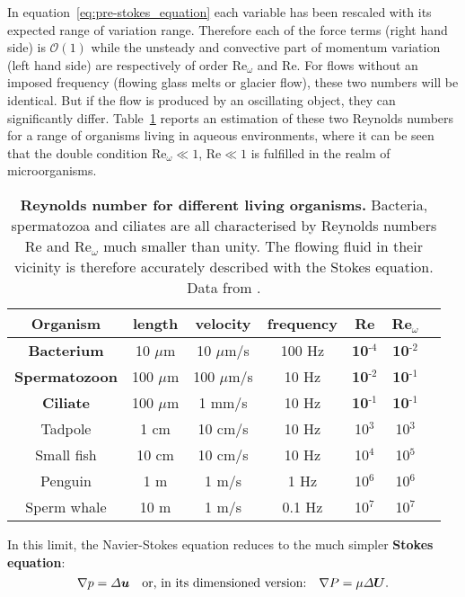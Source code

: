In equation~\eqref{eq:pre-stokes_equation} each variable has been rescaled with its expected range of variation range. Therefore each of the force terms (right hand side) is $\mathcal O(1)$ while the unsteady and convective part of momentum variation (left hand side) are respectively of order $\mathrm{Re}_\omega$ and $\mathrm{Re}$. For flows without an imposed frequency (flowing glass melts or glacier flow), these two numbers will be identical. But if the flow is produced by an oscillating object, they can significantly differ. Table~\ref{tbl:Reynolds} reports an estimation of these two Reynolds numbers for a range of organisms living in aqueous environments, where it can be seen that the double condition $\mathrm{Re}_\omega\ll 1$, $\mathrm{Re}\ll 1$ is fulfilled in the realm of microorganisms.
\begin{table}
\begin{center}
\begin{tabular}{ccccccc}
Organism & length & velocity & frequency & Re & Re$_\omega$\\
\hline\hline
\textbf{Bacterium} & 10 $\mu$m & 10 $\mu$m/s & 100 Hz & \textbf{10$^\text{-4}$} & \textbf{10$^\text{-2}$}\\
\textbf{Spermatozoon} & 100 $\mu$m & 100 $\mu$m/s & 10 Hz & \textbf{10$^\text{-2}$} & \textbf{10$^\text{-1}$}\\
\textbf{Ciliate} & 100 $\mu$m & 1 mm/s & 10 Hz & \textbf{10$^\text{-1}$} & \textbf{10$^\text{-1}$}\\
Tadpole & 1 cm & 10 cm/s & 10 Hz & 10$^\text{3}$ & 10$^\text{3}$\\
Small fish & 10 cm & 10 cm/s & 10 Hz & 10$^\text{4}$ & 10$^\text{5}$\\
Penguin & 1 m & 1 m/s & 1 Hz & 10$^\text{6}$ & 10$^\text{6}$\\
Sperm whale & 10 m & 1 m/s & 0.1 Hz & 10$^\text{7}$ & 10$^\text{7}$\\
\hline
\end{tabular}
\end{center}
\caption{\textbf{Reynolds number for different living organisms.} Bacteria, spermatozoa and ciliates are all characterised by Reynolds numbers Re and Re$_\omega$ much smaller than unity. The flowing fluid in their vicinity is therefore accurately described with the Stokes equation. Data from \citet{Lauga2020}.}
\label{tbl:Reynolds}
\end{table}

In this limit, the Navier-Stokes equation reduces to the much simpler \textbf{Stokes equation}:
\begin{equation}
\nabla p=\Delta \bu\quad\text{or, in its dimensioned version:}\quad\nabla P=\mu\Delta \bU.
\label{eq:stokes_equation}
\end{equation}


